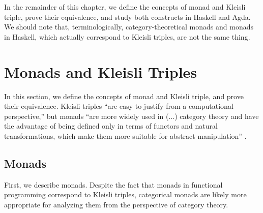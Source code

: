 In the remainder of this chapter, we define the concepts of monad and
Kleisli triple, prove their equivalence, and study both constructs in
Haskell and Agda. We should note that, terminologically,
category-theoretical monads and monads in Haskell, which actually
correspond to Kleisli triples, are not the same thing.

\section{Monads and Kleisli Triples}
\label{sec:monads}

In this section, we define the concepts of monad and Kleisli triple,
and prove their equivalence. Kleisli triples ``are easy to justify
from a computational perspective,'' but monads ``are more widely used
in (...) category theory and have the advantage of being defined only
in terms of functors and natural transformations, which make them more
suitable for abstract manipulation'' \parencite[60]{moggi-1991}.

\subsection{Monads}

First, we describe monads. Despite the fact that monads in functional
programming correspond to Kleisli triples, categorical monads are
likely more appropriate for analyzing them from the perspective of
category theory.

